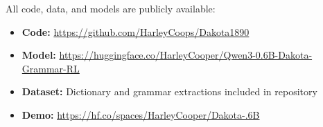 \documentclass{article}
\begin{document}
All code, data, and models are publicly available:

\begin{itemize}
    \item \textbf{Code:} \url{https://github.com/HarleyCoops/Dakota1890}
    \item \textbf{Model:} \url{https://huggingface.co/HarleyCooper/Qwen3-0.6B-Dakota-Grammar-RL}
    \item \textbf{Dataset:} Dictionary and grammar extractions included in repository
    \item \textbf{Demo:} \url{https://hf.co/spaces/HarleyCooper/Dakota-.6B}
\end{itemize}
\end{document}
